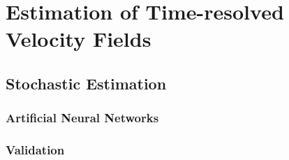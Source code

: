 \chapter{Estimation of Time-resolved Velocity Fields}
\section{Stochastic Estimation}
\subsection{Artificial Neural Networks}
\subsection{Validation}